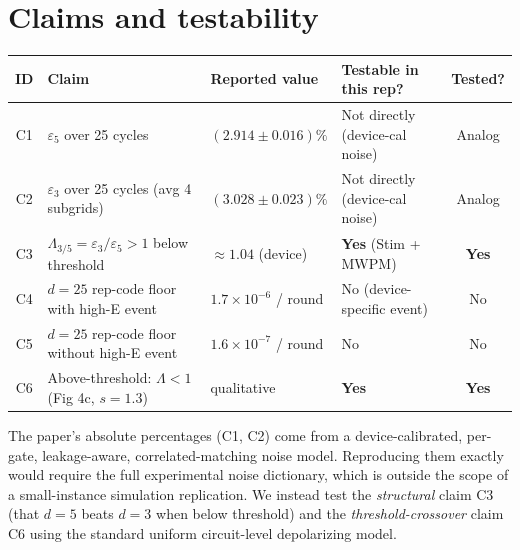 \documentclass[11pt]{article}
\begin{document}
\section{Claims and testability}
\begin{center}\small
\begin{tabular}{clllc}
\toprule
ID & Claim & Reported value & Testable in this rep? & Tested? \\
\midrule
C1 & $\varepsilon_5$ over 25 cycles                                  & $(2.914\pm0.016)\%$              & Not directly (device-cal noise) & Analog \\
C2 & $\varepsilon_3$ over 25 cycles (avg 4 subgrids)                 & $(3.028\pm0.023)\%$              & Not directly (device-cal noise) & Analog \\
C3 & $\Lambda_{3/5} = \varepsilon_3/\varepsilon_5 > 1$ below threshold & $\approx 1.04$ (device)          & \textbf{Yes} (Stim + MWPM)     & \textbf{Yes} \\
C4 & $d\!=\!25$ rep-code floor with high-E event                     & $1.7\times10^{-6}$ / round       & No (device-specific event)     & No \\
C5 & $d\!=\!25$ rep-code floor without high-E event                  & $1.6\times10^{-7}$ / round       & No                              & No \\
C6 & Above-threshold: $\Lambda<1$ (Fig 4c, $s=1.3$)                  & qualitative                       & \textbf{Yes}                    & \textbf{Yes} \\
\bottomrule
\end{tabular}
\end{center}

The paper's absolute percentages (C1, C2) come from a device-calibrated,
per-gate, leakage-aware, correlated-matching noise model. Reproducing them
exactly would require the full experimental noise dictionary, which is
outside the scope of a small-instance simulation replication. We instead
test the \emph{structural} claim C3 (that $d=5$ beats $d=3$ when below
threshold) and the \emph{threshold-crossover} claim C6 using the standard
uniform circuit-level depolarizing model.
\end{document}
